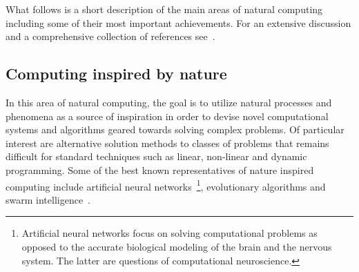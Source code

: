 	What follows is a short description of the main areas of natural computing including some of their most important achievements. For an extensive discussion and a comprehensive collection of references see~\cite{de2007fundamentals}.

	\subsection{Computing inspired by nature}

		In this area of natural computing, the goal is to utilize natural processes and phenomena as a source of inspiration in order to devise novel computational systems and algorithms geared towards solving complex problems. Of particular interest are alternative solution methods to classes of problems that remains difficult for standard techniques such as linear, non-linear and dynamic programming. Some of the best known representatives of nature inspired computing include artificial neural networks~\footnote{Artificial neural networks focus on solving computational problems as opposed to the accurate biological modeling of the brain and the nervous system. The latter are questions of computational neuroscience.}, evolutionary algorithms and swarm intelligence~\cite{de2007fundamentals}.

